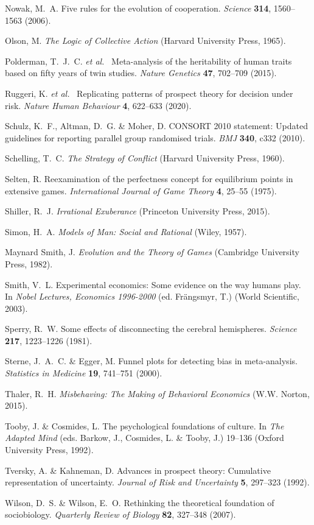 \documentclass[11pt,twocolumn]{article}
\begin{document}
\begin{thebibliography}{30}
Nowak, M.~A. Five rules for the evolution of cooperation. {\em Science} {\bf 314}, 1560--1563 (2006).

Olson, M. {\em The Logic of Collective Action} (Harvard University Press, 1965).

Polderman, T.~J.~C. {\em et al.}~ Meta-analysis of the heritability of human traits based on fifty years of twin studies. {\em Nature Genetics} {\bf 47}, 702--709 (2015).

Ruggeri, K. {\em et al.}~ Replicating patterns of prospect theory for decision under risk. {\em Nature Human Behaviour} {\bf 4}, 622--633 (2020).

Schulz, K.~F., Altman, D.~G. \& Moher, D. CONSORT 2010 statement: Updated guidelines for reporting parallel group randomised trials. {\em BMJ} {\bf 340}, c332 (2010).

Schelling, T.~C. {\em The Strategy of Conflict} (Harvard University Press, 1960).

Selten, R. Reexamination of the perfectness concept for equilibrium points in extensive games. {\em International Journal of Game Theory} {\bf 4}, 25--55 (1975).

Shiller, R.~J. {\em Irrational Exuberance} (Princeton University Press, 2015).

Simon, H.~A. {\em Models of Man: Social and Rational} (Wiley, 1957).

Maynard Smith, J. {\em Evolution and the Theory of Games} (Cambridge University Press, 1982).

Smith, V.~L. Experimental economics: Some evidence on the way humans play. In {\em Nobel Lectures, Economics 1996-2000} (ed. Frängsmyr, T.) (World Scientific, 2003).

Sperry, R.~W. Some effects of disconnecting the cerebral hemispheres. {\em Science} {\bf 217}, 1223--1226 (1981).

Sterne, J.~A.~C. \& Egger, M. Funnel plots for detecting bias in meta-analysis. {\em Statistics in Medicine} {\bf 19}, 741--751 (2000).

Thaler, R.~H. {\em Misbehaving: The Making of Behavioral Economics} (W.W. Norton, 2015).

Tooby, J. \& Cosmides, L. The psychological foundations of culture. In {\em The Adapted Mind} (eds. Barkow, J., Cosmides, L. \& Tooby, J.) 19--136 (Oxford University Press, 1992).

Tversky, A. \& Kahneman, D. Advances in prospect theory: Cumulative representation of uncertainty. {\em Journal of Risk and Uncertainty} {\bf 5}, 297--323 (1992).

Wilson, D.~S. \& Wilson, E.~O. Rethinking the theoretical foundation of sociobiology. {\em Quarterly Review of Biology} {\bf 82}, 327--348 (2007).

\end{thebibliography}
\end{document}
